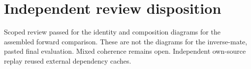 \section*{Independent review disposition}
Scoped review passed for the identity and composition diagrams for the assembled forward comparison. These are not the diagrams for the inverse-mate, pasted final evaluation. Mixed coherence remains open. Independent own-source replay reused external dependency caches.
